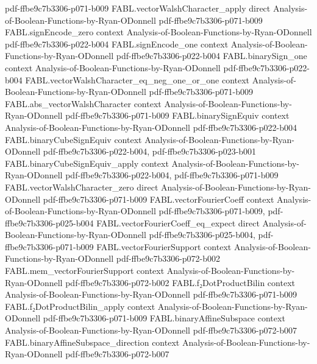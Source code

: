 \begin{theorem}
  {pdf-ffbe9c7b3306-p071-b009}
\proofstep
  {FABL.vectorWalshCharacter_apply}
  {direct}
  {Analysis-of-Boolean-Functions-by-Ryan-ODonnell}
  {pdf-ffbe9c7b3306-p071-b009}
\proofstep
  {FABL.signEncode_zero}
  {context}
  {Analysis-of-Boolean-Functions-by-Ryan-ODonnell}
  {pdf-ffbe9c7b3306-p022-b004}
\proofstep
  {FABL.signEncode_one}
  {context}
  {Analysis-of-Boolean-Functions-by-Ryan-ODonnell}
  {pdf-ffbe9c7b3306-p022-b004}
\proofstep
  {FABL.binarySign_one}
  {context}
  {Analysis-of-Boolean-Functions-by-Ryan-ODonnell}
  {pdf-ffbe9c7b3306-p022-b004}
\proofstep
  {FABL.vectorWalshCharacter_eq_neg_one_or_one}
  {context}
  {Analysis-of-Boolean-Functions-by-Ryan-ODonnell}
  {pdf-ffbe9c7b3306-p071-b009}
\proofstep
  {FABL.abs_vectorWalshCharacter}
  {context}
  {Analysis-of-Boolean-Functions-by-Ryan-ODonnell}
  {pdf-ffbe9c7b3306-p071-b009}
\proofstep
  {FABL.binarySignEquiv}
  {context}
  {Analysis-of-Boolean-Functions-by-Ryan-ODonnell}
  {pdf-ffbe9c7b3306-p022-b004}
\proofstep
  {FABL.binaryCubeSignEquiv}
  {context}
  {Analysis-of-Boolean-Functions-by-Ryan-ODonnell}
  {pdf-ffbe9c7b3306-p022-b004,
    pdf-ffbe9c7b3306-p023-b001}
\proofstep
  {FABL.binaryCubeSignEquiv_apply}
  {context}
  {Analysis-of-Boolean-Functions-by-Ryan-ODonnell}
  {pdf-ffbe9c7b3306-p022-b004,
    pdf-ffbe9c7b3306-p071-b009}
\proofstep
  {FABL.vectorWalshCharacter_zero}
  {direct}
  {Analysis-of-Boolean-Functions-by-Ryan-ODonnell}
  {pdf-ffbe9c7b3306-p071-b009}
\proofstep
  {FABL.vectorFourierCoeff}
  {context}
  {Analysis-of-Boolean-Functions-by-Ryan-ODonnell}
  {pdf-ffbe9c7b3306-p071-b009,
    pdf-ffbe9c7b3306-p025-b004}
\proofstep
  {FABL.vectorFourierCoeff_eq_expect}
  {direct}
  {Analysis-of-Boolean-Functions-by-Ryan-ODonnell}
  {pdf-ffbe9c7b3306-p025-b004,
    pdf-ffbe9c7b3306-p071-b009}
\proofstep
  {FABL.vectorFourierSupport}
  {context}
  {Analysis-of-Boolean-Functions-by-Ryan-ODonnell}
  {pdf-ffbe9c7b3306-p072-b002}
\proofstep
  {FABL.mem_vectorFourierSupport}
  {context}
  {Analysis-of-Boolean-Functions-by-Ryan-ODonnell}
  {pdf-ffbe9c7b3306-p072-b002}
\proofstep
  {FABL.f₂DotProductBilin}
  {context}
  {Analysis-of-Boolean-Functions-by-Ryan-ODonnell}
  {pdf-ffbe9c7b3306-p071-b009}
\proofstep
  {FABL.f₂DotProductBilin_apply}
  {context}
  {Analysis-of-Boolean-Functions-by-Ryan-ODonnell}
  {pdf-ffbe9c7b3306-p071-b009}
\proofstep
  {FABL.binaryAffineSubspace}
  {context}
  {Analysis-of-Boolean-Functions-by-Ryan-ODonnell}
  {pdf-ffbe9c7b3306-p072-b007}
\proofstep
  {FABL.binaryAffineSubspace_direction}
  {context}
  {Analysis-of-Boolean-Functions-by-Ryan-ODonnell}
  {pdf-ffbe9c7b3306-p072-b007}

\end{theorem}
